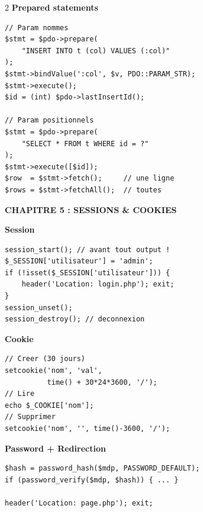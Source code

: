 \documentclass[11pt,a4paper]{article}
\begin{document}
\begin{multicols}{2}
\vspace{4pt}
\textcolor{uirblue}{\textbf{Prepared statements}}
\begin{lstlisting}[language=PHP2, numbers=none]
// Param nommes
$stmt = $pdo->prepare(
    "INSERT INTO t (col) VALUES (:col)"
);
$stmt->bindValue(':col', $v, PDO::PARAM_STR);
$stmt->execute();
$id = (int) $pdo->lastInsertId();

// Param positionnels
$stmt = $pdo->prepare(
    "SELECT * FROM t WHERE id = ?"
);
$stmt->execute([$id]);
$row  = $stmt->fetch();     // une ligne
$rows = $stmt->fetchAll();  // toutes
\end{lstlisting}

\vspace{4pt}
\noindent\colorbox{uirblue!15}{\parbox{\linewidth-2pt}{\bfseries CHAPITRE 5 : SESSIONS \& COOKIES}}

\vspace{4pt}
\textcolor{uirblue}{\textbf{Session}}
\begin{lstlisting}[language=PHP2, numbers=none]
session_start(); // avant tout output !
$_SESSION['utilisateur'] = 'admin';
if (!isset($_SESSION['utilisateur'])) {
    header('Location: login.php'); exit;
}
session_unset();
session_destroy(); // deconnexion
\end{lstlisting}

\vspace{4pt}
\textcolor{uirblue}{\textbf{Cookie}}
\begin{lstlisting}[language=PHP2, numbers=none]
// Creer (30 jours)
setcookie('nom', 'val',
          time() + 30*24*3600, '/');
// Lire
echo $_COOKIE['nom'];
// Supprimer
setcookie('nom', '', time()-3600, '/');
\end{lstlisting}

\vspace{4pt}
\textcolor{uirblue}{\textbf{Password + Redirection}}
\begin{lstlisting}[language=PHP2, numbers=none]
$hash = password_hash($mdp, PASSWORD_DEFAULT);
if (password_verify($mdp, $hash)) { ... }

header('Location: page.php'); exit;
\end{lstlisting}

\end{multicols}
\end{document}
